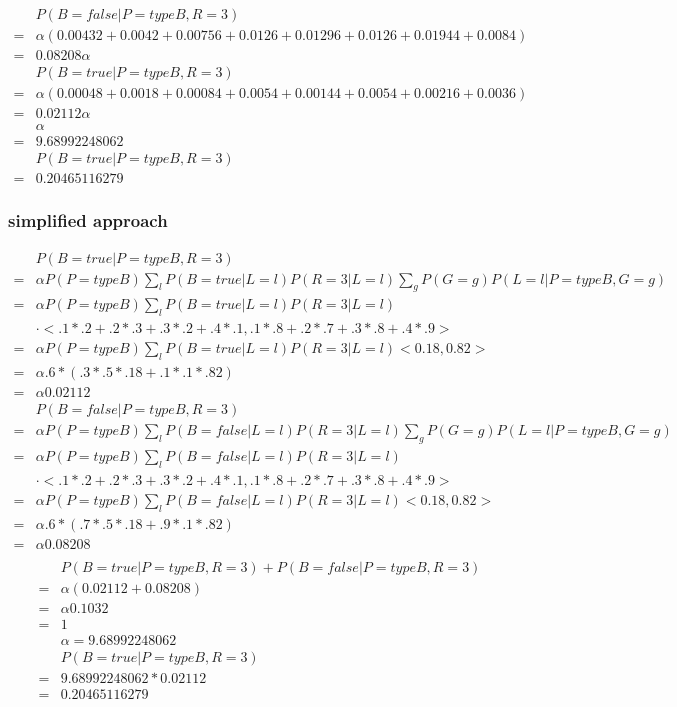 \documentclass[12pt]{article}
\begin{document}
\begin{align*}
  &P(B=false | P=typeB, R=3)\\
  =& \alpha (0.00432+0.0042+0.00756+0.0126+0.01296+0.0126+0.01944+0.0084)\\
  =& 0.08208 \alpha\\
  &P(B=true | P=typeB, R=3)\\
  =& \alpha (0.00048+0.0018+0.00084+0.0054+0.00144+0.0054+0.00216+0.0036)\\
  =& 0.02112 \alpha\\
  &\alpha\\
  =& 9.68992248062\\
  &P(B=true | P=typeB, R=3)\\
  =&0.20465116279
\end{align*}
\subsubsection{simplified approach}
\begin{align*}
  &P(B=true | P=typeB, R=3)\\
  =& \alpha P(P=typeB) \sum_l P(B=true|L=l)P(R=3|L=l) \sum_g P(G=g)P(L=l|P=typeB,G=g)\\
  =& \alpha P(P=typeB) \sum_l P(B=true|L=l)P(R=3|L=l)\\
  & \cdot <.1*.2+.2*.3+.3*.2+.4*.1,.1*.8+.2*.7+.3*.8+.4*.9>\\
  =& \alpha P(P=typeB) \sum_l P(B=true|L=l)P(R=3|L=l) <0.18, 0.82>\\
  =& \alpha .6* (.3*.5*.18+.1*.1*.82)\\
  =& \alpha 0.02112\\
  &P(B=false | P=typeB, R=3)\\
  =& \alpha P(P=typeB) \sum_l P(B=false|L=l)P(R=3|L=l) \sum_g P(G=g)P(L=l|P=typeB,G=g)\\
  =& \alpha P(P=typeB) \sum_l P(B=false|L=l)P(R=3|L=l)\\
  & \cdot <.1*.2+.2*.3+.3*.2+.4*.1,.1*.8+.2*.7+.3*.8+.4*.9>\\
  =& \alpha P(P=typeB) \sum_l P(B=false|L=l)P(R=3|L=l) <0.18, 0.82>\\
  =& \alpha .6* (.7*.5*.18+.9*.1*.82)\\
  =& \alpha 0.08208\\
\end{align*}
\begin{align*}
  &P(B=true | P=typeB, R=3)+P(B=false | P=typeB, R=3)\\
  =& \alpha (0.02112+0.08208)\\
  =& \alpha 0.1032\\
  =& 1\\
  &\alpha = 9.68992248062\\
  &P(B=true | P=typeB, R=3)\\
  =& 9.68992248062*0.02112\\
  =& 0.20465116279
\end{align*}
\end{document}

